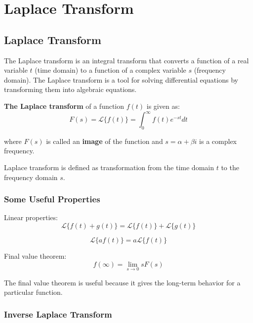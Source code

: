 \section{Laplace Transform}

\subsection{Laplace Transform}

The Laplace transform is an integral transform that converts a function of a real variable \(t\) (time domain) to a function of a complex variable \(s\) (frequency domain). 
The Laplace transform is a tool for solving differential equations by transforming them into algebraic equations.

\textbf{The Laplace transform }of a function \(f(t)\) is given as:
\begin{equation}
    F(s) = \mathcal{L} \{ f(t)\} = \int_0^\infty f(t) e^{-st}dt
\end{equation}

where \(F(s)\) is called an \textbf{image} of the function and \(s=\alpha +\beta i \) is a complex frequency.

Laplace transform is defined as transformation from the time domain \(t\) to the frequency domain \(s\).

\subsubsection{Some Useful Properties}

Linear properties:
\begin{equation}
    {\mathcal {L}}\{f(t)+g(t)\}={\mathcal {L}}\{f(t)\}+{\mathcal {L}}\{g(t)\}
\end{equation}

\begin{equation}
    {\mathcal {L}}\{af(t)\}=a{\mathcal {L}}\{f(t)\}
\end{equation}

Final value theorem:
\begin{equation}
    f(\infty )=\lim _{s\to 0}{sF(s)}
\end{equation}

The final value theorem is useful because it gives the long-term behavior for a particular function.

\subsubsection{Inverse Laplace Transform}

